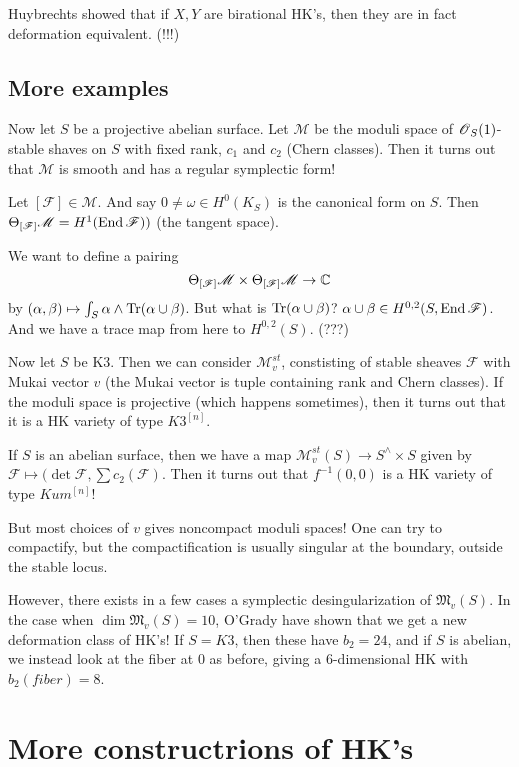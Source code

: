 \documentclass[11pt, english]{article}
\begin{document}
Huybrechts showed that if $X,Y$ are birational HK's, then they are in fact deformation equivalent. (!!!)

\subsection{More examples}

Now let $S$ be a projective abelian surface. Let $\mathscr M$ be the moduli space of $\operatorname{\mathscr{O}}_S(1)$-stable shaves on $S$ with fixed rank, $c_1$ and $c_2$ (Chern classes). Then it turns out that $\mathscr M$ is smooth and has a regular symplectic form!

Let $[\mathscr F] \in \mathscr M$. And say $0 \neq \omega \in H^0(K_S)$ is the canonical form on $S$. Then $\Theta_{[\mathscr F]} \mathscr M = H^1(\operatorname{End} \mathscr F))$ (the tangent space). 

We want to define a pairing
$$
\Theta_{[\mathscr F]} \mathscr M \times \Theta_{[\mathscr F]} \mathscr M  \to \mathbb{C}
$$
by $(\alpha, \beta) \mapsto \int_S \alpha \wedge \operatorname{Tr}(\alpha \cup \beta)$. But what is $\operatorname{Tr}(\alpha \cup \beta)$? $\alpha \cup \beta \in H^{0,2}(S, \operatorname{End} \mathscr F)$. And we have a trace map from here to $H^{0,2}(S)$. (???)

Now let $S$ be K3. Then we can consider $\mathscr M_v^{st}$, constisting of stable sheaves $\mathscr F$ with Mukai vector $v$ (the Mukai vector is tuple containing rank and Chern classes). If the moduli space is projective (which happens sometimes), then it turns out that it is a HK variety of type $K3^{[n]}$. 

If $S$ is an abelian surface, then we have a map $\mathscr M_v^{st}(S) \to S^\wedge \times S$ given by $\mathscr F \mapsto (\det \mathscr F, \sum c_2(\mathscr F)$. Then it turns out that $f^{-1}(0,0)$ is a HK variety of type $Kum^{[n]}$!

But most choices of $v$ gives noncompact moduli spaces! One can try to compactify, but the compactification is usually singular at the boundary, outside the stable locus. 

However, there exists in a few cases a symplectic desingularization of $\mathfrak M_v(S)$. In the case when $\dim \mathfrak M_v(S)=10$, O'Grady have shown that we get a new deformation class of HK's! If $S=K3$, then these have $b_2=24$, and if $S$ is abelian, we instead look at the fiber at $0$ as before, giving a 6-dimensional HK with $b_2(fiber)=8$. 

\section{More constructrions of HK's}
\end{document}
